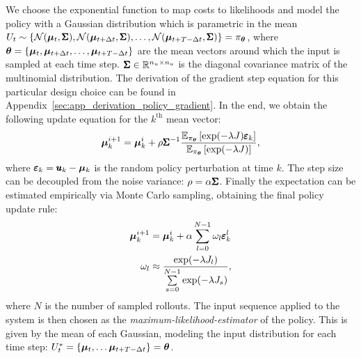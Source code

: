 We choose the exponential function to map costs to likelihoods and model the policy with a Gaussian distribution which is parametric in the mean $U_t \sim \{\mathcal{N}(\boldsymbol{\mu}_t, \pmb{\Sigma}), \mathcal{N}(\boldsymbol{\mu}_{t+\Delta t}, \pmb{\Sigma}), \dots, \mathcal{N}(\boldsymbol{\mu}_{t+T-\Delta t}, \pmb{\Sigma})\} = \pi_{\boldsymbol{\theta}}$, where $\boldsymbol{\theta} =  \{\boldsymbol{\mu}_t, \boldsymbol{\mu}_{t+\Delta t}, \dots, \boldsymbol{\mu}_{t+T-\Delta t}\}$ are the mean vectors around which the input is sampled at each time step. $\pmb{\Sigma} \in \mathbb{R}^{n_u \times n_u}$ is the diagonal covariance matrix of the multinomial distribution. The derivation of the gradient step equation for this particular design choice can be found in Appendix~\ref{sec:app_derivation_policy_gradient}. In the end, we obtain the following update equation for the $k^{\text{th}}$ mean vector:
\begin{equation}
    \boldsymbol{\mu}^{i+1}_{k} = \boldsymbol{\mu}^{i}_{k} +  \rho \pmb{\Sigma}^{-1} \frac{\mathbb{E}_{\pi_{\boldsymbol{\theta}}} \left [\exp( -\lambda J) \pmb{\varepsilon}_k \right]}{\mathbb{E}_{\pi_{\boldsymbol{\theta}}} \left [\exp( -\lambda J)\right]}  \label{eq:alpha_assumption},
\end{equation}
where $\pmb{\varepsilon}_k = \pmb{u}_k - \boldsymbol{\mu}_k$ is the random policy perturbation at time $k$.
The step size can be decoupled from the noise variance: $\rho = \alpha \pmb{\Sigma} $. Finally the expectation can be estimated empirically via Monte Carlo sampling, obtaining the final policy update rule:
\begin{align} \label{eq:update_rule}
  \boldsymbol{\mu}^{i+1}_{k} &= \boldsymbol{\mu}^{i}_{k} + \alpha  \sum \limits_{l=0}^{N-1}  \omega_l \pmb{\varepsilon}_{k}^{l} \\
  \omega_l  &\approx \frac{\exp ( -\lambda J_l )}{\sum \limits_{s=0}^{N-1} \exp ( -\lambda J_s)}, \label{eq:weighting}
\end{align}
where $N$ is the number of sampled rollouts. 
The input sequence applied to the system is then chosen as the \emph{maximum-likelihood-estimator} of the policy. This is given by the mean of each Gaussian, modeling the input distribution for each time step: $U^*_t = \{\boldsymbol{\mu}_t, \dots \boldsymbol{\mu}_{t+T-\Delta t}\} = \boldsymbol{\theta}$.

